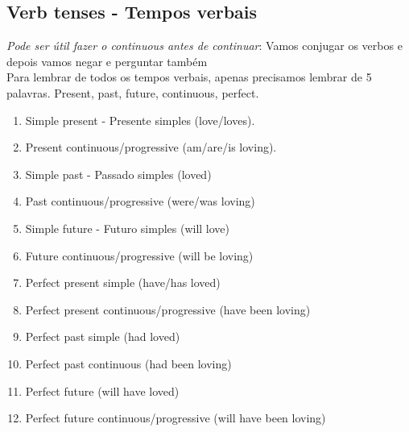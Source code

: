 \documentclass[12pt,a4paper]{article} %
\begin{document}
\subsection{Verb tenses - Tempos verbais}
\textit{Pode ser útil fazer o continuous antes de continuar}:
Vamos conjugar os verbos e depois vamos negar e perguntar também\\
Para lembrar de todos os tempos verbais, apenas precisamos lembrar de 5 palavras. Present, past, future, continuous, perfect.
\begin{enumerate}
\item Simple present - Presente simples (love/loves).
\item Present continuous/progressive (am/are/is loving).
\item Simple past - Passado simples (loved)
\item Past continuous/progressive (were/was loving)
\item Simple future - Futuro simples (will love)
\item Future continuous/progressive (will be loving)
\item Perfect present simple (have/has loved)
\item Perfect present continuous/progressive (have been loving)
\item Perfect past simple (had loved)
\item Perfect past continuous (had been loving)
\item Perfect future (will have loved)
\item Perfect future continuous/progressive (will have been loving)
\end{enumerate}
\end{document}
